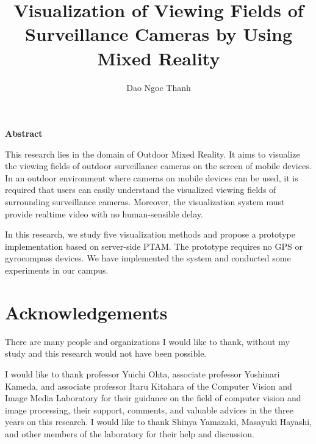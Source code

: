 \documentclass[a4paper,11pt]{report}
\title{Visualization of Viewing Fields of Surveillance Cameras by Using Mixed Reality}
\author{Dao Ngoc Thanh}
\begin{document}
\maketitle
\thispagestyle{empty}
\newpage

\thispagestyle{empty}
\vspace*{20pt plus 1fil}
\noindent
\begin{center}
{\bf Abstract}
\vspace{5mm}
\end{center}
This research lies in the domain of Outdoor Mixed Reality. It aims to visualize the viewing fields of outdoor surveillance cameras on the screen of mobile devices. In an outdoor environment where cameras on mobile devices can be used, it is required that users can easily understand the visualized viewing fields of surrounding surveillance cameras. Moreover, the visualization system must provide realtime video with no human-sensible delay.

In this research, we study five visualization methods and propose a prototype implementation based on server-side PTAM. The prototype requires no GPS or gyrocompass devices. We have implemented the system and conducted some experiments in our campus.

\par
\vspace{0pt plus 1fil}
\newpage

\tableofcontents
\listoffigures

\pagebreak \setcounter{page}{1}







\chapter*{Acknowledgements}

There are many people and organizations I would like to thank, without my study and this research would not have been possible.

I would like to thank professor Yuichi Ohta, associate professor Yoshinari Kameda, and associate professor Itaru Kitahara of the Computer Vision and Image Media Laboratory for their guidance on the field of computer vision and image processing, their support, comments, and valuable advices in the three years on this research. I would like to thank Shinya Yamazaki, Masayuki Hayashi, and other members of the laboratory for their help and discussion.
\end{document}
